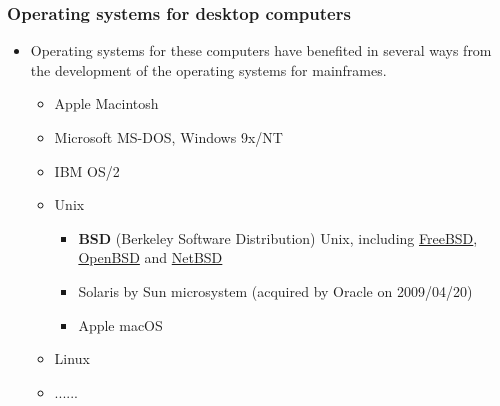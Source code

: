 \documentclass[CJKutf8,dvipsnames,table]{beamer}
\begin{document}
\begin{CJK*}{UTF8}{song}
  \begin{frame}
  \frametitle{Operating systems for desktop computers} \pause
	  \begin{itemize}
	  	\item{Operating systems for these computers have benefited in several ways from the development of the operating systems for mainframes.} \pause
	    \begin{itemize}
		    \item{Apple Macintosh} \pause
		    \item{Microsoft MS-DOS, Windows 9x/NT} \pause
		    \item{IBM OS/2} \pause
		    \item{Unix} \pause
		      \begin{itemize}
		      \item{\textbf{BSD} (Berkeley Software Distribution) Unix, including \href{https://www.freebsd.org/}{FreeBSD}, \href{https://www.openbsd.org/}{OpenBSD} and \href{https://www.netbsd.org/}{NetBSD}} \pause
		      \item{Solaris by Sun microsystem (acquired by Oracle on 2009/04/20)} \pause
		      \item{Apple macOS} \pause
		      \end{itemize}
			\item{Linux} \pause
		    \item{......}
	    \end{itemize}
	  \end{itemize}
  \end{frame}


\end{CJK*}
\end{document}
